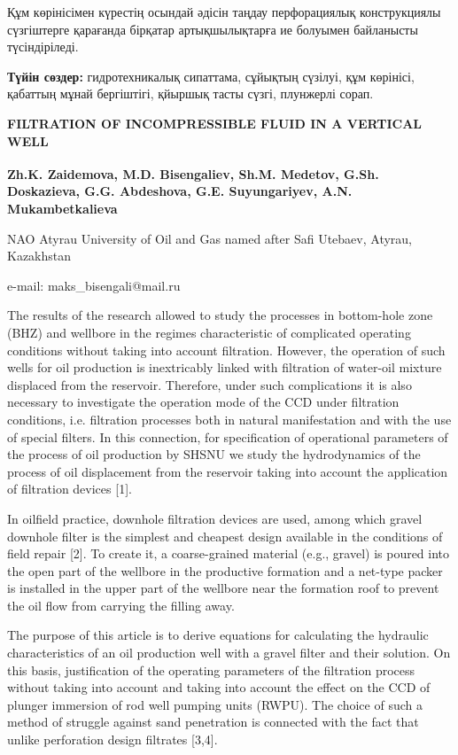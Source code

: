 Құм көрінісімен күрестің осындай әдісін таңдау перфорациялық
конструкциялы сүзгіштерге қарағанда бірқатар артықшылықтарға ие болуымен
байланысты түсіндіріледі.

{\bfseries Түйін сөздер:} гидротехникалық сипаттама, сұйықтың сүзілуі, құм
көрінісі, қабаттың мұнай бергіштігі, қйыршық тасты сүзгі, плунжерлі
сорап.

\begin{articleheader}
{\bfseries FILTRATION OF INCOMPRESSIBLE FLUID IN A VERTICAL WELL}

{\bfseries
Zh.K. Zaidemova,
M.D. Bisengaliev\textsuperscript{\envelope },
Sh.M. Medetov,
G.Sh. Doskazieva,
G.G. Abdeshova,
G.E. Suyungariyev,
A.N. Mukambetkalieva
}
\end{articleheader}

\begin{affiliation}
NAO Atyrau University of Oil and Gas named after Safi Utebaev, Atyrau, Kazakhstan

e-mail: maks\_bisengali@mail.ru
\end{affiliation}

The results of the research allowed to study the processes in
bottom-hole zone (BHZ) and wellbore in the regimes characteristic of
complicated operating conditions without taking into account filtration.
However, the operation of such wells for oil production is inextricably
linked with filtration of water-oil mixture displaced from the
reservoir. Therefore, under such complications it is also necessary to
investigate the operation mode of the CCD under filtration conditions,
i.e. filtration processes both in natural manifestation and with the use
of special filters. In this connection, for specification of operational
parameters of the process of oil production by SHSNU we study the
hydrodynamics of the process of oil displacement from the reservoir
taking into account the application of filtration devices {[}1{]}.

In oilfield practice, downhole filtration devices are used, among which
gravel downhole filter is the simplest and cheapest design available in
the conditions of field repair {[}2{]}. To create it, a coarse-grained
material (e.g., gravel) is poured into the open part of the wellbore in
the productive formation and a net-type packer is installed in the upper
part of the wellbore near the formation roof to prevent the oil flow
from carrying the filling away.

The purpose of this article is to derive equations for calculating the
hydraulic characteristics of an oil production well with a gravel filter
and their solution. On this basis, justification of the operating
parameters of the filtration process without taking into account and
taking into account the effect on the CCD of plunger immersion of rod
well pumping units (RWPU). The choice of such a method of struggle
against sand penetration is connected with the fact that unlike
perforation design filtrates {[}3,4{]}.

